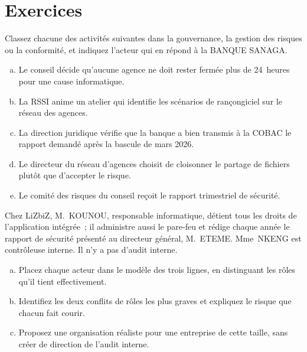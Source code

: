 \section*{Exercices}

\begin{boxexo}[title={\ding{45}\quad Exercice~1.1. Gouvernance, risque ou conformité~? \niveaubase}]
Classez chacune des activités suivantes dans la gouvernance, la gestion des
risques ou la conformité, et indiquez l'acteur qui en répond à la BANQUE
SANAGA.
\begin{enumerate}[(a)]
    \item Le conseil décide qu'aucune agence ne doit rester fermée plus de
          24~heures pour une cause informatique.
    \item La RSSI anime un atelier qui identifie les scénarios de
          rançongiciel sur le réseau des agences.
    \item La direction juridique vérifie que la banque a bien transmis à la
          COBAC le rapport demandé après la bascule de mars 2026.
    \item Le directeur du réseau d'agences choisit de cloisonner le partage
          de fichiers plutôt que d'accepter le risque.
    \item Le comité des risques du conseil reçoit le rapport trimestriel
          de sécurité.
\end{enumerate}
\end{boxexo}

\begin{boxexo}[title={\ding{45}\quad Exercice~1.2. Les trois lignes de LiZbiZ \niveaumoyen}]
Chez LiZbiZ, M.~KOUNOU, responsable informatique, détient tous les droits
de l'application intégrée~; il administre aussi le pare-feu et rédige
chaque année le rapport de sécurité présenté au directeur général,
M.~ETEME. Mme~NKENG est contrôleuse interne. Il n'y a pas d'audit interne.
\begin{enumerate}[(a)]
    \item Placez chaque acteur dans le modèle des trois lignes, en
          distinguant les rôles qu'il tient effectivement.
    \item Identifiez les deux conflits de rôles les plus graves et
          expliquez le risque que chacun fait courir.
    \item Proposez une organisation réaliste pour une entreprise de cette
          taille, sans créer de direction de l'audit interne.
\end{enumerate}
\end{boxexo}

